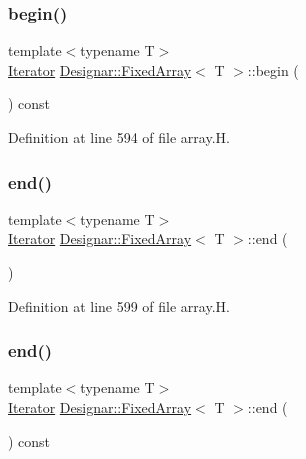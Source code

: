\subsubsection{\texorpdfstring{begin()}{begin()}\hspace{0.1cm}{\footnotesize\ttfamily [2/2]}}
{\footnotesize\ttfamily template$<$typename T$>$ \\
\hyperlink{class_designar_1_1_fixed_array_1_1_iterator}{Iterator} \hyperlink{class_designar_1_1_fixed_array}{Designar\+::\+Fixed\+Array}$<$ T $>$\+::begin (\begin{DoxyParamCaption}{ }\end{DoxyParamCaption}) const\hspace{0.3cm}{\ttfamily [inline]}}



Definition at line 594 of file array.\+H.

\mbox{\label{class_designar_1_1_fixed_array_ab0baaf67153a51cb98ac12918d2387a0}} 
\subsubsection{\texorpdfstring{end()}{end()}\hspace{0.1cm}{\footnotesize\ttfamily [1/2]}}
{\footnotesize\ttfamily template$<$typename T$>$ \\
\hyperlink{class_designar_1_1_fixed_array_1_1_iterator}{Iterator} \hyperlink{class_designar_1_1_fixed_array}{Designar\+::\+Fixed\+Array}$<$ T $>$\+::end (\begin{DoxyParamCaption}{ }\end{DoxyParamCaption})\hspace{0.3cm}{\ttfamily [inline]}}



Definition at line 599 of file array.\+H.

\mbox{\label{class_designar_1_1_fixed_array_a02b4949630ddc32ba5971fd4b78cf8ab}} 
\subsubsection{\texorpdfstring{end()}{end()}\hspace{0.1cm}{\footnotesize\ttfamily [2/2]}}
{\footnotesize\ttfamily template$<$typename T$>$ \\
\hyperlink{class_designar_1_1_fixed_array_1_1_iterator}{Iterator} \hyperlink{class_designar_1_1_fixed_array}{Designar\+::\+Fixed\+Array}$<$ T $>$\+::end (\begin{DoxyParamCaption}{ }\end{DoxyParamCaption}) const\hspace{0.3cm}{\ttfamily [inline]}}



